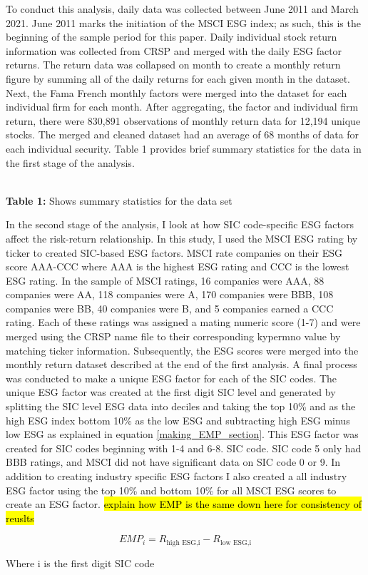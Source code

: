 To conduct this analysis, daily data was collected between June 2011 and March 2021.  June 2011 marks the initiation of the MSCI ESG index; as such, this is the beginning of the sample period for this paper. Daily individual stock return information was collected from CRSP and merged with the daily ESG factor returns. The return data was collapsed on month to create a monthly return figure by summing all of the daily returns for each given month in the dataset. Next, the Fama French monthly factors were merged into the dataset for each individual firm for each month. After aggregating, the factor and individual firm return, there were 830,891 observations of monthly return data for 12,194 unique stocks. The merged and cleaned dataset had an average of 68 months of data for each individual security. Table 1 provides brief summary statistics for the data in the first stage of the analysis.

\begin{center}
    \paperspacingnarrow
    \\
    \textbf{Table 1:} Shows summary statistics for the data set
    \paperspacingwide
\end{center}

In the second stage of the analysis, I look at how SIC code-specific ESG factors affect the risk-return relationship. In this study, I used the MSCI ESG rating by ticker to created SIC-based ESG factors. MSCI rate companies on their ESG score AAA-CCC where AAA is the highest ESG rating and CCC is the lowest ESG rating. In the sample of MSCI ratings, 16 companies were AAA, 88 companies were AA, 118 companies were A, 170 companies were BBB, 108 companies were BB, 40 companies were B, and 5 companies earned a CCC rating.  Each of these ratings was assigned a mating numeric score (1-7) and were merged using the CRSP name file to their corresponding kypermno value by matching ticker information. Subsequently, the ESG scores were merged into the monthly return dataset described at the end of the first analysis. A final process was conducted to make a unique ESG factor for each of the SIC codes. The unique ESG factor was created at the first digit SIC level and generated by splitting the SIC level ESG data into deciles and taking the top 10\% and as the high ESG index bottom 10\% as the low ESG and subtracting high ESG minus low ESG as explained in equation \eqref{making_EMP_section}. This ESG factor was created for SIC codes beginning with 1-4 and 6-8. SIC code. SIC code 5 only had BBB ratings, and MSCI did not have significant data on SIC code 0 or 9. In addition to creating industry specific ESG factors I also created a all industry ESG factor using the top 10\% and bottom 10\% for all MSCI ESG scores to create an ESG factor. \hl{explain how EMP is the same down here for consistency of reuslts}

\begin{equation}
    \label{making_EMP_section}
    EMP_i = R_{\text{high ESG,i}}- R_{\text{low ESG,i}}
\end{equation}

\begin{center}
    Where i is the first digit SIC code    
\end{center}



